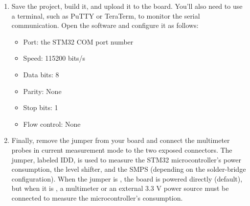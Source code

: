 \documentclass[10pt,a4paper,onecolumn]{article}
\let\textttOrig=\texttt
\def\texttt#1{\expandafter\textttOrig{\seqsplit{#1}}}
\providecommand{\tightlist}{%
  \setlength{\itemsep}{0pt}\setlength{\parskip}{0pt}}
\begin{document}
\begin{enumerate}
  \textbf{Modified:}

  \begin{lstlisting}[style=CStyle]
  extern void MX_UARTx_DeInit(void);
  extern void MX_GPIO_Disable(void);
  #define AI_MIN_LOOP 16

  AI_API_ENTRY
  ai_i32 ai_mnetwork_run(ai_handle network, const ai_buffer* input, ai_buffer* output)
  {
      struct network_instance* inn;
      static ai_i32 Counter = 0;
      inn =  ai_mnetwork_handle((struct network_instance *)network);
      if (inn == NULL)
          return 0;
      if (Counter < AI_MIN_LOOP)
      {
          Counter++;
          return inn->entry->ai_run(inn->handle, input, output);
      }
      else
      {
          printf("\nStarting infinite power measurement loop\n");
          MX_UARTx_DeInit();
          MX_GPIO_Disable();
          while(1)
          {
              inn->entry->ai_run(inn->handle, input, output);
          }
      } 
  }
  \end{lstlisting}

\item
  Save the project, build it, and upload it to the board. You'll also
  need to use a terminal, such as PuTTY or TeraTerm, to monitor the
  serial communication. Open the software and configure it as follows:

  \begin{itemize}
  \tightlist
  \item
    Port: the STM32 COM port number
  \item
    Speed: 115200 bits/s
  \item
    Data bits: 8
  \item
    Parity: None
  \item
    Stop bits: 1
  \item
    Flow control: None
  \end{itemize}

\item
  Finally, remove the \texttt{JP3} jumper from your board and connect the multimeter probes in current measurement mode to the two exposed connectors. The \texttt{JP3} jumper, labeled IDD, is used to measure the STM32 microcontroller's power consumption, the level shifter, and the SMPS (depending on the solder-bridge configuration). When the jumper is \texttt{ON}, the board is powered directly (default), but when it is \texttt{OFF}, a multimeter or an external 3.3 V power source must be connected to measure the microcontroller's consumption.


\end{enumerate}
\end{document}
